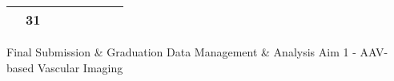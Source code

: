 {\begin{tabularx}{\linewidth}{|l!{\vrule width \myLenLineThicknessThick}*{7}{@{}X@{}|}}
       & 
    
      
      
        \begin{minipage}[t]{6mm}\centering{}31\end{minipage}
      
       & 
    
      
      
       & 
    
      
      
       & 
    
      
      
       & 
    
      
      
       & 
    
      
      
      
        \\  \hline 
      
    
  
  
  \end{tabularx}
}
\vfill{\centering{} \small{Final Submission \& Graduation}\hspace{ 1.5em } \small{Data Management \& Analysis}\hspace{ 1.5em } \small{Aim 1 - AAV-based Vascular Imaging}\hspace{ 1.5em }\par}

